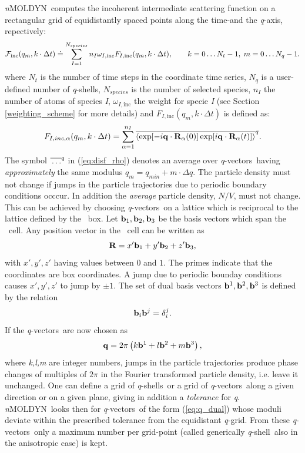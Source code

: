 \documentclass[a4paper,11pt]{report}
\newcommand{\qval}{\textit{q}}
\newcommand{\qvects}{\textit{q}-vectors}
\newcommand{\qshell}{\textit{q}-shell}
\newcommand{\qshells}{\textit{q}-shells}
\newcommand{\NMOLDYN}{\textit{n}MOLDYN}
\begin{document}
\NMOLDYN\ computes the incoherent intermediate scattering function on a rectangular grid of equidistantly spaced points 
along the time-and the \qval-axis, repectively:
\begin{equation}
{\cal F}_{\mathrm{inc}}(q_m,k\cdot\Delta t) \doteq \sum_{I = 1}^{N_{species}} n_I \omega_{I,\mathrm{inc}} F_{I,\mathrm{inc}}(q_m,k\cdot\Delta t),
\qquad k = 0\ldots N_t - 1,\; m = 0\ldots N_q - 1. 
\end{equation}
where $N_t$ is the number of time steps in the coordinate time series, $N_q$ is a user-defined number of \qshells, 
$N_{species}$ is the number of selected species, $n_I$ the number of atoms of species \textit{I}, $\omega_{I,\mathrm{inc}}$ 
the weight for specie \textit{I} (see Section \ref{weighting_scheme} for more details) and $F_{I,\mathrm{inc}}(q_m,k\cdot\Delta t)$ is defined as:
\begin{equation}
\label{eq:disf_rho}
F_{I, inc,\alpha}(q_m,k\cdot\Delta t) = \sum_{\alpha=1}^{n_I}\overline{\langle\exp[-i{\bf q}\cdot{\bf R}_\alpha(0)]\exp[i{\bf q}\cdot{\bf R}_\alpha(t)]\rangle}^q.
\end{equation}
The symbol $\overline{\rule{0pt}{5pt}\ldots}^{q}$ in (\ref{eq:disf_rho}) denotes an average over \qvects\ having 
{\em approximately} the same modulus $q_m = q_{min} + m\cdot\Delta q$. The particle density must not change if jumps in 
the particle trajectories due to periodic boundary conditions occcur. In addition the {\em average} particle density, 
$N/V$, must not change. This can be achieved by choosing \qvects\ on a lattice which is reciprocal to the lattice defined 
by the \MD\ box. Let ${\bf b}_1,{\bf b}_2,{\bf b}_3$ be the basis vectors which span the \MD\ cell. Any position vector in the 
\MD\ cell can be written as
\begin{equation}
{\bf R} = x'{\bf b}_1 + y'{\bf b}_2 + z'{\bf b}_3,
\end{equation}
with $x',y',z'$ having values between $0$ and $1$.  The primes indicate that the coordinates are box coordinates. A jump due 
to periodic bounday conditions causes $x',y',z'$ to jump by $\pm 1$.  The set of dual basis vectors ${\bf b}^1,{\bf b}^2,{\bf b}^3$ 
is defined by the relation
\begin{equation}
{\bf b}_i{\bf b}^j = \delta_i^j.
\end{equation}
If the \qvects\ are now chosen as
\begin{equation}
\label{eq:q_dual}
{\bf q} = 2\pi\left(k{\bf b}^1 + l{\bf b}^2 + m{\bf b}^3\right),
\end{equation}
where \textit{k,l,m} are integer numbers, jumps in the particle trajectories produce phase changes of multiples of $2\pi$ in the 
Fourier transformed particle density, i.e. leave it unchanged. One can define a grid of \qshells\ or a grid of \qvects\ 
along a given direction or on a given plane, giving in addition a {\em tolerance} for \qval. \NMOLDYN\ looks then for 
\qvects\ of the form (\ref{eq:q_dual}) whose moduli deviate within the prescribed tolerance from the equidistant \qval-grid. 
From these \qvects\ only a maximum number per grid-point (called generically \qshell\ also in the anisotropic case) is 
kept.
\end{document}
